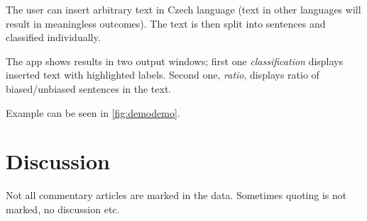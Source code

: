 The user can insert arbitrary text in Czech language (text in other languages will result in meaningless outcomes). The text is then split into sentences and classified individually.

The app shows results in two output windows; first one \textit{classification} displays inserted text with highlighted labels. Second one, \textit{ratio}, displays ratio of biased/unbiased sentences in the text.

Example can be seen in \ref{fig:demodemo}.

\begin{figure}[h]
\end{figure}


\begin{figure}
\end{figure}

\section{Discussion}
Not all commentary articles are marked in the data.
Sometimes quoting is not marked, no discussion etc.
